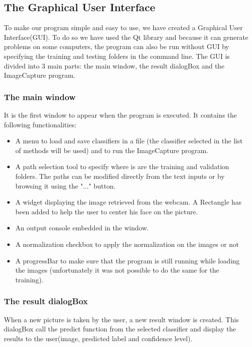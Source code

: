 \subsection{The Graphical User Interface}

To make our program simple and easy to use, we have created a Graphical User Interface(GUI). To do so we have used the Qt library and because it can 
generate problems on some computers, the program can also be run without GUI by specifying the training and testing folders in the command line.
The GUI is divided into 3 main parts: the main window, the result dialogBox and the ImageCapture program.

\subsubsection{The main window}

It is the first window to appear when the program is executed. It contains the following functionalities:
\begin{itemize}
 \item A menu to load and save classifiers in a file (the classifier selected in the list of methods will be used) and to run the ImageCapture 
program.

\item A path selection tool to specify where is are the training and validation folders. The paths can be modified directly from the text inputs or 
by browsing it using the "..." button.

\item A widget displaying the image retrieved from the webcam. A Rectangle has been added to help the user to center his face on the picture.
\item An output console embedded in the window.
\item A normalization checkbox to apply the normalization on the images or not
\item A progressBar to make sure that the program is still running while loading the images (unfortunately it was not possible to do the same for the 
training).
\end{itemize}

\subsubsection{The result dialogBox}
When a new picture is taken by the user, a new result window is created. This dialogBox call the predict function from the selected classifier and 
display the results to the user(image, predicted label and confidence level).

